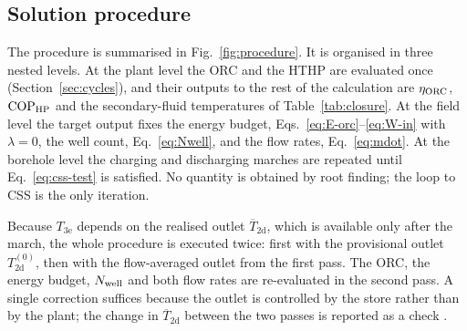 \subsection{Solution procedure}
\label{sec:procedure}

The procedure is summarised in Fig.~\ref{fig:procedure}. It is organised in
three nested levels. At the plant level the ORC and the HTHP are evaluated
once (Section~\ref{sec:cycles}), and their outputs to the rest of the
calculation are $\eta_{\mathrm{ORC}}$, $\mathrm{COP}_{\mathrm{HP}}$ and the secondary-fluid temperatures of
Table~\ref{tab:closure}. At the field level the target output fixes the
energy budget, Eqs.~\eqref{eq:E-orc}--\eqref{eq:W-in} with $\lambda=0$, the
well count, Eq.~\eqref{eq:Nwell}, and the flow rates, Eq.~\eqref{eq:mdot}.
At the borehole level the charging and discharging marches are repeated until
Eq.~\eqref{eq:css-test} is satisfied. No quantity is obtained by root finding;
the loop to CSS is the only iteration.

Because $T_\mathrm{3e}$ depends on the realised outlet $\overline{T}_\mathrm{2d}$,
which is available only after the march, the whole procedure is executed
twice: first with the provisional outlet $T_\mathrm{2d}^{(0)}$, then with the
flow-averaged outlet from the first pass. The ORC, the energy budget, $N_{\mathrm{well}}$
and both flow rates are re-evaluated in the second pass. A single correction
suffices because the outlet is controlled by the store rather than by the
plant; the change in $\overline{T}_\mathrm{2d}$ between the two passes is
reported as a check .

